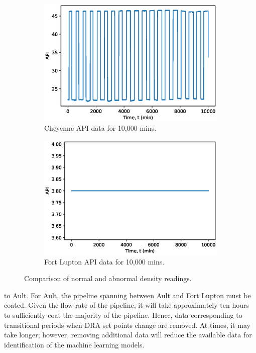 \begin{figure}[ht]
     \centering
     \begin{subfigure}[b]{0.48\textwidth}
         \centering
         \includegraphics[width=\textwidth]{images/08CheyDensity.eps}
         \caption{Cheyenne API data for 10,000 mins.}
         \label{fig:08GoodDensity}
     \end{subfigure}
     \hfill
     \begin{subfigure}[b]{0.48\textwidth}
         \centering
         \includegraphics[width=\textwidth]{images/08FLDensity.eps}
         \caption{Fort Lupton API data for 10,000 mins.}
         \label{fig:08BadDensity}
     \end{subfigure}
        \caption{Comparison of normal and abnormal density readings.}
        \label{fig:08Density}
\end{figure}to Ault.  For Ault, the pipeline spanning between Ault and Fort Lupton must be coated.  Given the flow rate of the pipeline, it will take approximately ten hours to sufficiently coat the majority of the pipeline. Hence, data corresponding to transitional periods when DRA set points change are removed. At times, it may take longer; however, removing additional data will reduce the available data for identification of the machine learning models.  

